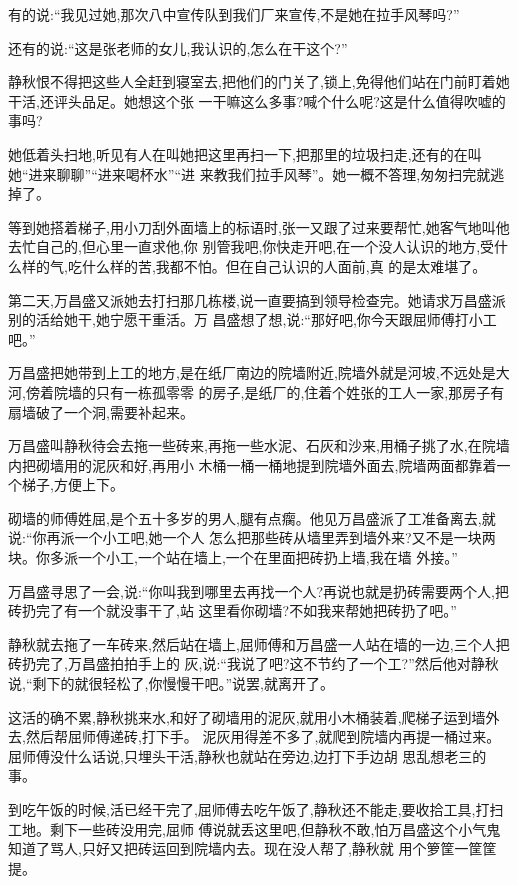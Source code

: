 ﻿\documentclass[12pt]{article}
\begin{document}
有的说:``我见过她,那次八中宣传队到我们厂来宣传,不是她在拉手风琴吗?''

还有的说:``这是张老师的女儿,我认识的,怎么在干这个?''

静秋恨不得把这些人全赶到寝室去,把他们的门关了,锁上,免得他们站在门前盯着她干活,还评头品足。她想这个张
一干嘛这么多事?喊个什么呢?这是什么值得吹嘘的事吗?

她低着头扫地,听见有人在叫她把这里再扫一下,把那里的垃圾扫走,还有的在叫她``进来聊聊''``进来喝杯水''``进
来教我们拉手风琴''。她一概不答理,匆匆扫完就逃掉了。

等到她搭着梯子,用小刀刮外面墙上的标语时,张一又跟了过来要帮忙,她客气地叫他去忙自己的,但心里一直求他,你
别管我吧,你快走开吧,在一个没人认识的地方,受什么样的气,吃什么样的苦,我都不怕。但在自己认识的人面前,真
的是太难堪了。


第二天,万昌盛又派她去打扫那几栋楼,说一直要搞到领导检查完。她请求万昌盛派别的活给她干,她宁愿干重活。万
昌盛想了想,说:``那好吧,你今天跟屈师傅打小工吧。''

万昌盛把她带到上工的地方,是在纸厂南边的院墙附近,院墙外就是河坡,不远处是大河,傍着院墙的只有一栋孤零零
的房子,是纸厂的,住着个姓张的工人一家,那房子有扇墙破了一个洞,需要补起来。

万昌盛叫静秋待会去拖一些砖来,再拖一些水泥、石灰和沙来,用桶子挑了水,在院墙内把砌墙用的泥灰和好,再用小
木桶一桶一桶地提到院墙外面去,院墙两面都靠着一个梯子,方便上下。

砌墙的师傅姓屈,是个五十多岁的男人,腿有点瘸。他见万昌盛派了工准备离去,就说:``你再派一个小工吧,她一个人
怎么把那些砖从墙里弄到墙外来?又不是一块两块。你多派一个小工,一个站在墙上,一个在里面把砖扔上墙,我在墙
外接。''

万昌盛寻思了一会,说:``你叫我到哪里去再找一个人?再说也就是扔砖需要两个人,把砖扔完了有一个就没事干了,站
这里看你砌墙?不如我来帮她把砖扔了吧。''

静秋就去拖了一车砖来,然后站在墙上,屈师傅和万昌盛一人站在墙的一边,三个人把砖扔完了,万昌盛拍拍手上的
灰,说:``我说了吧?这不节约了一个工?''然后他对静秋说,``剩下的就很轻松了,你慢慢干吧。''说罢,就离开了。

这活的确不累,静秋挑来水,和好了砌墙用的泥灰,就用小木桶装着,爬梯子运到墙外去,然后帮屈师傅递砖,打下手。
泥灰用得差不多了,就爬到院墙内再提一桶过来。屈师傅没什么话说,只埋头干活,静秋也就站在旁边,边打下手边胡
思乱想老三的事。

到吃午饭的时候,活已经干完了,屈师傅去吃午饭了,静秋还不能走,要收拾工具,打扫工地。剩下一些砖没用完,屈师
傅说就丢这里吧,但静秋不敢,怕万昌盛这个小气鬼知道了骂人,只好又把砖运回到院墙内去。现在没人帮了,静秋就
用个箩筐一筐筐提。
\end{document}
